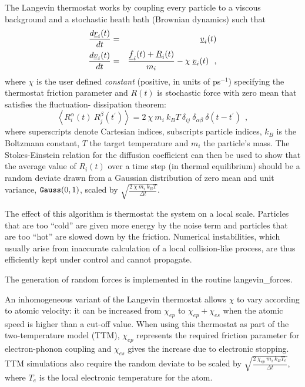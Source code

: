 The Langevin thermostat works by coupling every particle to a
viscous background and a stochastic heath bath (Brownian dynamics) such that
\begin{eqnarray}
{d \mbox{$\underline{r}$}_{i}(t) \over d t} &=& \mbox{$\underline{v}$}_{i}(t) \nonumber \\
{d \mbox{$\underline{v}$}_{i}(t) \over d t} &=& {{\mbox{$\underline{f}$}_{i}(t)+\mbox{$\underline{R}$}_{i}(t)} \over
m_{i}} - \chi \; \mbox{$\underline{v}$}_{i}(t)~~,
\end{eqnarray}
where $\chi$ is the user defined {\em constant} (positive, in units of
ps$^{-1}$) specifying the thermostat friction parameter and $R(t)$ is
stochastic force with zero mean that satisfies the fluctuation-
dissipation theorem:
\begin{equation}
\left< R^{\alpha}_{i}(t)~R^{\beta}_{j}(t^\prime)\right> =
2~\chi~m_{i}~k_{B}T~\delta_{ij}~\delta_{\alpha \beta}~\delta(t-t^\prime)~~, \label{langevin}
\end{equation}
where superscripts denote Cartesian indices, subscripts particle
indices, $k_{B}$ is the Boltzmann constant, $T$ the target
temperature and $m_{i}$ the particle's mass.  The Stokes-Einstein
relation for the diffusion coefficient can then be used to show
that the average value of $R_{i}(t)$ over a time step (in thermal
equilibrium) should be a random deviate drawn from a Gaussian
distribution of zero mean and unit variance, ${\tt Gauss}(0,1)$,
scaled by $\sqrt{\frac{2~\chi~m_{i}~k_{B}T}{\Delta t}}$.

The effect of this algorithm is thermostat the system on a local
scale.  Particles that are too ``cold'' are given more energy by
the noise term and particles that are too ``hot'' are slowed down
by the friction.  Numerical instabilities, which usually arise from
inaccurate calculation of a local collision-like process, are thus
efficiently kept under control and cannot propagate.

The generation of random forces is implemented in the routine
{\sc langevin\_forces}.

An inhomogeneous variant of the Langevin thermostat \cite{duffy-07a}
allows $\chi$ to vary according to atomic velocity: it can be increased
from $\chi_{ep}$ to $\chi_{ep} + \chi_{es}$ when the atomic speed is
higher than a cut-off value. When using this thermostat as part of the
two-temperature model (TTM), $\chi_{ep}$ represents the required
friction parameter for electron-phonon coupling and $\chi_{es}$ gives
the increase due to electronic stopping. TTM simulations also
require the random deviate to be scaled by
$\sqrt{\frac{2~\chi_{ep}~m_{i}~k_{B}T_{e}}{\Delta t}}$, where
$T_{e}$ is the local electronic temperature for the atom.

